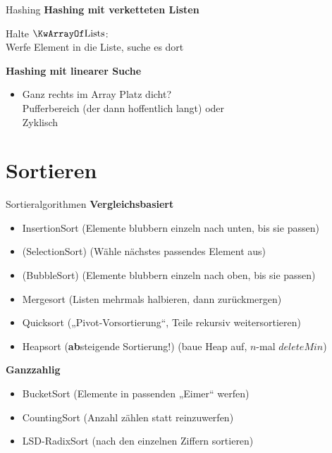 \begin{frame}{Hashing}	
	\textbf{Hashing mit verketteten Listen}
	\begin{itemize}
		\implitem Halte $\KwArrayOf \text{Lists}$: \\ 
		Werfe Element in die Liste, suche es dort
	\end{itemize}
	\pause
	\textbf{Hashing mit linearer Suche}
	\begin{itemize}
		\implitem Nur $\KwArrayOf \text{Element}$: \\
		Platz besetzt? Gucke rechts davon. \\
		Beim \textbf{Löschen}: Ggfs. wieder nach links zurückschieben, damit Lücken wieder zu!
		\item Ganz rechts im Array Platz dicht? \\
		\impl Pufferbereich (der dann hoffentlich langt)  \quad oder \\
		\impl Zyklisch 
	\end{itemize}
\end{frame}
	


\section{Sortieren}

\begin{frame}{Sortieralgorithmen}
	\textbf{Vergleichsbasiert}
	\begin{itemize}
		\item InsertionSort \hfill {\small (Elemente blubbern einzeln nach unten, bis sie passen)}
		\item (SelectionSort) \hfill {\small (Wähle nächstes passendes Element aus)}
		\item (BubbleSort) \hfill {\small (Elemente blubbern einzeln nach oben, bis sie passen)}
		\item Mergesort \hfill {\small (Listen mehrmals halbieren, dann zurückmergen)}
		\item Quicksort \hfill  {\small („Pivot-Vorsortierung“, Teile rekursiv weitersortieren)} 
		\item Heapsort (\textbf{ab}steigende Sortierung!) \hfill {\small (baue Heap auf, $n$-mal $deleteMin$)}  
	\end{itemize}
	\textbf{Ganzzahlig}
	\begin{itemize}
		\item BucketSort \hfill {\small (Elemente in passenden „Eimer“ werfen)}
		\item CountingSort \hfill {\small (Anzahl zählen statt reinzuwerfen)}
		\item LSD-RadixSort \hfill {\small (nach den einzelnen Ziffern sortieren)}
	\end{itemize}
\end{frame}

